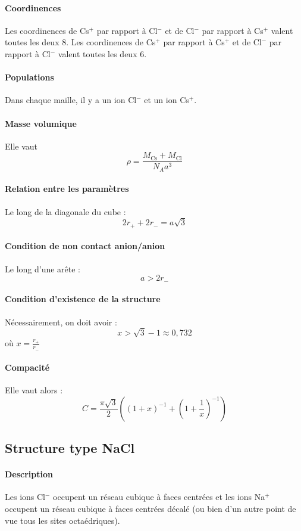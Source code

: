 \documentclass[french]{book}
\theoremstyle{plain}
\theoremstyle{definition}
\theoremstyle{remark}
\newcommand{\inv}{^{-1}}
\begin{document}
\paragraph{Coordinences} Les coordinences de Cs$^+$ par rapport à Cl$^-$ et de Cl$^-$ par rapport à Cs$^+$ valent toutes les deux $8$. Les coordinences de Cs$^+$ par rapport à Cs$^+$ et de Cl$^-$ par rapport à Cl$^-$ valent toutes les deux 6.
\paragraph{Populations} Dans chaque maille, il y a un ion Cl$^-$ et un ion Cs$^+$.
\paragraph{Masse volumique} Elle vaut $$\rho=\frac{M_{\text{Cs}}+M_\text{Cl}}{N_Aa^3}$$
\paragraph{Relation entre les paramètres} Le long de la diagonale du cube : $$2r_++2r_-=a\sqrt{3}$$
\paragraph{Condition de non contact anion/anion} Le long d'une arête : $$a>2r_-$$
\paragraph{Condition d'existence de la structure} Nécessairement, on doit avoir : $$x>\sqrt{3}-1\approx 0,732$$ où $x=\displaystyle\frac{r_+}{r_-}$
\paragraph{Compacité} Elle vaut alors : $$C=\frac{\pi\sqrt{3}}{2}\left(\left(1+x\right)\inv+\left(1+\frac{1}{x}\right)\inv\right)$$

\subsection{Structure type NaCl}
\paragraph{Description} Les ions Cl$^-$ occupent un réseau cubique à faces centrées et les ions Na$^+$ occupent un réseau cubique à faces centrées décalé (ou bien d'un autre point de vue tous les sites octaédriques).
\end{document}
